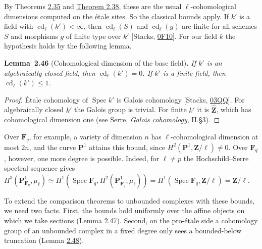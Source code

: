 \documentclass[11pt]{article}
\newenvironment{bpstatement}[2]{\par\addvspace{0.6\baselineskip}\noindent\textbf{#1}#2\textbf{.}\enspace\ignorespaces}
  {\par\addvspace{0.4\baselineskip}}
\newenvironment{bpstatementit}[2]{\begin{bpstatement}{#1}{#2}\itshape\ignorespaces}{\end{bpstatement}}
\begin{document}
\label{bp138}%
By Theorems \hyperref[bp103]{2.35} and \hyperref[bp113]{Theorem 2.38}, these are the usual \(\ell\)-cohomological dimensions computed on the étale sites. So the classical bounds apply. If \(k'\) is a field with \(\operatorname{cd}_\ell(k')<\infty\), then \(\operatorname{cd}_\ell(S)\) and \(\operatorname{cd}_\ell(g)\) are finite for all schemes \(S\) and morphisms \(g\) of finite type over \(k'\) [Stacks, \href{https://stacks.math.columbia.edu/tag/0F10}{0F10}]. For our field \(k\) the hypothesis holds by the following lemma.

\label{bp139}%
\begin{bpstatementit}{Lemma~2.46}{ (Cohomological dimension of the base field)}
If \(k'\) is an algebraically closed field, then \(\operatorname{cd}_\ell(k')=0\). If \(k'\) is a finite field, then \(\operatorname{cd}_\ell(k')\le1\).
\end{bpstatementit}

\begin{proof}[{Proof}]\label{bp140}%
Étale cohomology of \(\operatorname{Spec}k'\) is Galois cohomology [Stacks, \href{https://stacks.math.columbia.edu/tag/03QQ}{03QQ}]. For algebraically closed \(k'\) the Galois group is trivial. For finite \(k'\) it is \(\widehat{\mathbf Z}\), which has cohomological dimension one (see Serre, \emph{Galois cohomology}, II.§3).
\end{proof}

\label{bp141}%
Over \(\overline{\mathbf F}_q\), for example, a variety of dimension \(n\) has \(\ell\)-cohomological dimension at most \(2n\), and the curve \(\mathbf P^1\) attains this bound, since \(H^2(\mathbf P^1,\mathbf Z/\ell)\neq0\). Over \(\mathbf F_q\), however, one more degree is possible. Indeed, for \(\ell\neq p\) the Hochschild–Serre spectral sequence gives \(H^3(\mathbf P^1_{\mathbf F_q},\mu_\ell)\simeq
H^1(\operatorname{Spec}\mathbf F_q,H^2(\mathbf P^1_{\overline{\mathbf F}_q},\mu_\ell))
=H^1(\operatorname{Spec}\mathbf F_q,\mathbf Z/\ell)=\mathbf Z/\ell\).

To extend the comparison theorems to unbounded complexes with these bounds, we need two facts. First, the bounds hold uniformly over the affine objects on which we take sections (Lemma \hyperref[bp142]{2.47}). Second, on the pro-étale side a cohomology group of an unbounded complex in a fixed degree only sees a bounded-below truncation (Lemma \hyperref[bp144]{2.48}).
\end{document}

